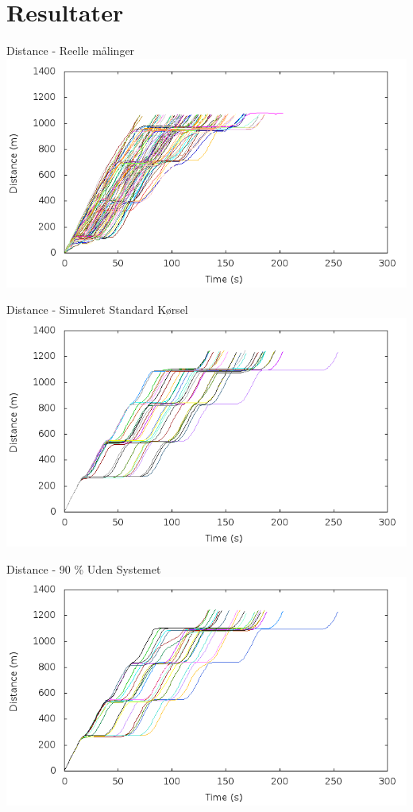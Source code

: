 \section{Resultater}

\begin{frame}{Distance - Reelle målinger}
\includegraphics[width=1\textwidth]{images/RealDistance.png}
\end{frame}

\begin{frame}{Distance - Simuleret Standard Kørsel}
\includegraphics[width=1\textwidth]{images/distanceUncontrolled0.png}
\end{frame}

\begin{frame}{Distance - 90 \% Uden Systemet}
\includegraphics[width=1\textwidth]{images/distanceUncontrolled10.png}
\end{frame}

